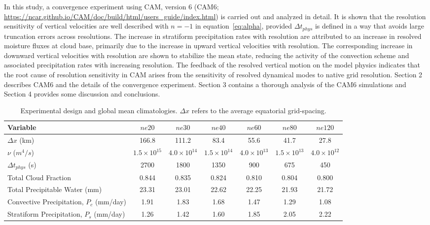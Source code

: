 \documentclass[times]{qjrms4}
\begin{document}
In this study, a convergence experiment using CAM, version 6 (CAM6; \url{https://ncar.github.io/CAM/doc/build/html/users_guide/index.html}) is carried out and analyzed in detail. It is shown that the resolution sensitivity of vertical velocities are well described with $n=-1$ in equation~\eqref{eq:alpha}, provided $\Delta t_{phys}$ is defined in a way that avoids large truncation errors across resolutions. The increase in stratiform precipitation rates with resolution are attributed to an increase in resolved moisture fluxes at cloud base, primarily due to the increase in upward vertical velocities with resolution. The corresponding increase in downward vertical velocities with resolution are shown to stabilize the mean state, reducing the activity of the convection scheme and associated precipitation rates with increasing resolution. The feedback of the resolved vertical motion on the model physics indicates that the root cause of resolution sensitivity in CAM arises from the sensitivity of resolved dynamical modes to native grid resolution. Section 2 describes CAM6 and the details of the convergence experiment. Section 3 contains a thorough analysis of the CAM6 simulations and Section 4 provides some discussion and conclusions.
 
 \begin{table}
 \caption{Experimental design and global mean climatologies. $\Delta x$ refers to the average equatorial grid-spacing.}
 \centering
 \scriptsize
 \begin{tabular}{lcccccc}
   \hline
   Variable & $ne20$ & $ne30$ & $ne40$ & $ne60$ & $ne80$ & $ne120$ \\ 
   \hline
   $\Delta x$ (km) & 166.8 & 111.2 & 83.4 & 55.6 & 41.7 & 27.8 \\
   $\nu$ ($m^4/s$) & $1.5 \times 10^{15}$ & $4.0 \times 10^{14}$ & $1.5 \times 10^{14}$ & $4.0 \times 10^{13}$  & $1.5 \times 10^{13}$ & $4.0 \times 10^{12}$\\
    $\Delta t_{phys}$ (s) & 2700 & 1800 & 1350 & 900 & 675 & 450 \\
   Total Cloud Fraction & 0.844 & 0.835 & 0.824 & 0.810 & 0.804 & 0.800 \\ 
   Total Precipitable Water (mm) & 23.31& 23.01 & 22.62 & 22.25 & 21.93 & 21.72 \\
   Convective Precipitation, $P_c$ (mm/day) & 1.91 & 1.83 & 1.68 & 1.47 & 1.29 & 1.08 \\
   Stratiform Precipitation, $P_s$ (mm/day) & 1.26 & 1.42 & 1.60 & 1.85 & 2.05 & 2.22 \\      
 \hline
 \end{tabular}
 \label{tbl:table1}
 \end{table}
 
\end{document}
